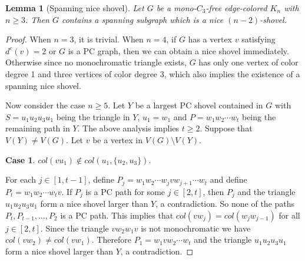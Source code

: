 \documentclass[10pt,a4paper]{article}
\newtheorem{lemma}{Lemma}
\theoremstyle{definition}
\newtheorem{case}{Case}
\begin{document}
\begin{lemma}[Spanning nice shovel]\label{Lem:SPANING}
     Let $G$ be a mono-$C_3$-free edge-colored $K_n$ with $n\geq 3$. Then $G$ contains a spanning subgraph which is a nice $(n-2)$-shovel.
\end{lemma}
\begin{proof}
    When $n=3$, it is trivial.
    When $n=4$, if $G$ has a vertex $v$ satisfying $d^c(v)=2$ or $G$ is a PC graph, then we can obtain a nice shovel immediately. Otherwise since no monochromatic triangle exists, $G$ has only one vertex of color degree 1 and three vertices of color degree 3, which also implies the existence of a spanning nice shovel.

    Now consider the case $n\geq5$. Let $Y$ be a largest PC shovel contained in $G$ with $S=u_1u_2u_3u_1$ being the triangle in $Y$, $u_1=w_1$ and $P=  w_1w_2\cdots w_t$ being the remaining path in $Y$. The above analysis implies $t\geq 2$. Suppose that $V(Y)\neq V(G)$. Let $v$ be a vertex in $V(G)\setminus V(Y)$.

    \begin{case}
         $col(vu_1)\not\in col(u_1,\{u_2,u_3\})$.
    \end{case}
    For each $j\in [1,t-1]$, define $P_j=w_1w_2\cdots w_jvw_{j+1}\cdots w_t$ and define $P_t=w_1w_2\cdots w_tv$. If $P_j$ is a PC path for some $j\in [2,t]$, then $P_j$ and the triangle $u_1u_2u_3u_1$ form a nice shovel larger than $Y$, a contradiction. So none of the paths $P_t,P_{t-1},\ldots, P_2$ is a PC path. This implies that $col(vw_j)=col(w_jw_{j-1})$ for all $j\in [2,t]$. Since the triangle $vw_2w_1v$ is not monochromatic we have $col(vw_2)\neq col(vw_1)$.  Therefore $P_1=w_1vw_2\cdots w_t$ and the triangle $u_1u_2u_3u_1$ form a nice shovel larger than $Y$, a contradiction.


\end{proof}
\end{document}
